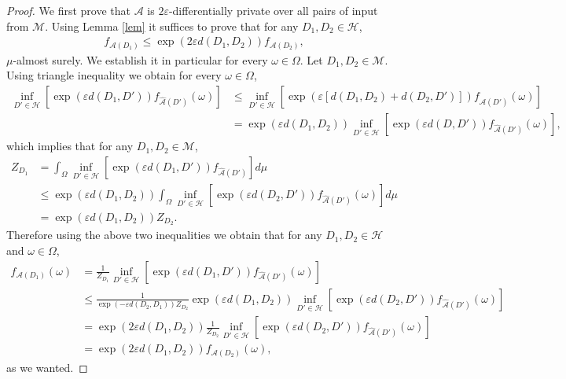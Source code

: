 \documentclass[12pt,a4paper]{article}
\numberwithin{equation}{section}
\numberwithin{equation}{section}
\renewcommand{\epsilon}{\varepsilon}
\newcommand{\1}{{\text{\Large $\mathfrak 1$}}}
\newcommand{\2}[1]{{\text{\Large $\mathfrak 1$}\!\left(#1\right)}}
\begin{document}
\begin{proof}
We first prove that $\mathcal{A}$ is $2\epsilon$-differentially private over all pairs of input from $\mathcal{M}$. Using Lemma \ref{lem} it suffices to prove that for any $D_1,D_2 \in \mathcal{H}$,
 \begin{align*}
f_{\mathcal{A}(D_1)} \leq \exp \left(2 \epsilon d(D_1,D_2)\right) f_{\mathcal{A}(D_2)},
\end{align*} $\mu$-almost surely. We establish it in particular for every $\omega \in \Omega$. Let $D_1,D_2 \in \mathcal{M}$. Using triangle inequality we obtain for every $\omega \in \Omega$, \begin{align*}\inf_{D' \in \mathcal{H}} \left[ \exp \left( \epsilon d(D_1,D')\right) f_{\hat{\mathcal{A}}(D')}(\omega) \right] & \leq \inf_{D' \in \mathcal{H}} \left[ \exp\left(\epsilon \left[d(D_1,D_2)+d(D_2,D')\right] \right) f_{\hat{\mathcal{A}}(D')}(\omega) \right]\\
&=\exp \left( \epsilon d(D_1,D_2)\right) \inf_{D' \in \mathcal{H}} \left[ \exp \left(\epsilon d(D,D')\right) f_{\hat{\mathcal{A}}(D')}(\omega) \right],
\end{align*}which implies that for any $D_1,D_2 \in \mathcal{M}$, 
\begin{align*}
Z_{D_1}&=\int_{\Omega} \inf_{D' \in \mathcal{H}} \left[ \exp\left(\epsilon d(D_1,D')\right) f_{\hat{\mathcal{A}}(D')} \right] d \mu \\
&\leq \exp\left(\epsilon d(D_1,D_2) \right)\int_{\Omega} \inf_{D' \in \mathcal{H}} \left[ \exp \left( \epsilon d(D_2,D') \right) f_{\hat{\mathcal{A}}(D')}(\omega) \right] d\mu\\
&=\exp \left( \epsilon d(D_1,D_2) \right) Z_{D_2}. 
\end{align*}Therefore using the above two inequalities we obtain that for any $D_1,D_2 \in \mathcal{H}$ and $\omega \in \Omega$,
 \begin{align*}
f_{\mathcal{A}(D_1)}(\omega) &=\frac{1}{Z_{D_1}} \inf_{D' \in \mathcal{H}} \left[ \exp \left( \epsilon d(D_1,D') \right) f_{\hat{\mathcal{A}}(D')}(\omega) \right] \\
&\leq \frac{1}{\exp\left(-\epsilon d(D_2,D_1)\right)Z_{D_2}}\exp\left(\epsilon d(D_1,D_2)\right) \inf_{D' \in \mathcal{H}}  \left[ \exp \left( \epsilon d(D_2,D') \right) f_{\hat{\mathcal{A}}(D')}(\omega) \right] \\
&=\exp \left(2 \epsilon d(D_1,D_2)\right) \frac{1}{Z_{D_2}} \inf_{D' \in \mathcal{H}}  \left[ \exp \left( \epsilon d(D_2,D') \right) f_{\hat{\mathcal{A}}(D')}(\omega) \right]\\
&=\exp \left(2 \epsilon d(D_1,D_2)\right) f_{\mathcal{A}(D_2)}(\omega),
\end{align*}as we wanted. 


\end{proof}
\end{document}
